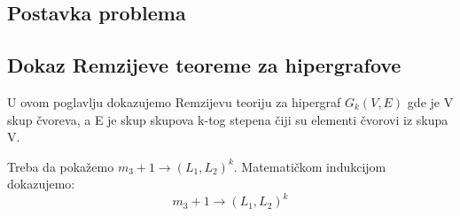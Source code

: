 \documentclass[a4paper]{article}
\begin{document}
	\subsection{Postavka problema}
	\subsection{Dokaz Remzijeve teoreme za hipergrafove}
	U ovom poglavlju dokazujemo Remzijevu teoriju %
	za hipergraf $ G_{k}(V, E)$ gde je V skup čvoreva, a E je skup skupova k-tog stepena čiji su elementi čvorovi iz skupa V.
	
	\noindent Treba da pokažemo $m_{3} + 1 \rightarrow (L_1, L_2)^k$. 
	Matematičkom indukcijom dokazujemo:
	\begin{equation}\label{OsnovnaRemzijeva}
		m_{3} + 1 \rightarrow (L_1, L_2)^k		
	\end{equation}
\end{document}
